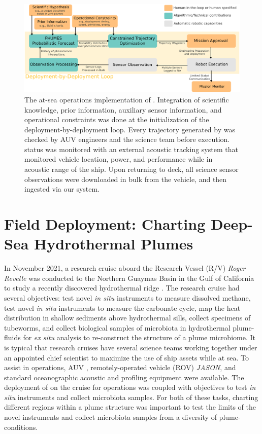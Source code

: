 \begin{figure}[h!]
    \centering
    \includegraphics[width=1\columnwidth]{figures/deployment_loop.png}
    \caption{The at-sea operations implementation of \PHORTEX. Integration of scientific knowledge, prior information, auxiliary sensor information, and operational constraints was done at the initialization of the \PHORTEX deployment-by-deployment loop. Every trajectory generated by \PHORTEX was checked by AUV \Sentry engineers and the science team before execution. \Sentry status was monitored with an external acoustic tracking system that monitored vehicle location, power, and performance while in acoustic range of the ship. Upon returning to deck, all science sensor observations were downloaded in bulk from the vehicle, and then ingested via our \PHORTEX system.}
    \label{fig:at_sea_ops}
\end{figure}



\section{Field Deployment: Charting Deep-Sea Hydrothermal Plumes}
\label{sec:field_results}

In November 2021, a research cruise aboard the Research Vessel (R/V) \emph{Roger Revelle} was conducted to the Northern Guaymas Basin in the Gulf of California to study a recently discovered hydrothermal ridge \cite{soule2018exploration, geilert2018formation}. The research cruise had several objectives: test novel \emph{in situ} instruments to measure dissolved methane, test novel \emph{in situ} instruments to measure the carbonate cycle, map the heat distribution in shallow sediments above hydrothermal sills, collect specimens of tubeworms, and collect biological samples of microbiota in hydrothermal plume-fluids for \emph{ex situ} analysis to re-construct the structure of a plume microbiome. It is typical that research cruises have several science teams working together under an appointed chief scientist to maximize the use of ship assets while at sea. To assist in operations, AUV \Sentry, remotely-operated vehicle (ROV) \emph{JASON}, and standard oceanographic acoustic and profiling equipment were available. The deployment of \PHORTEX on the cruise for \Sentry operations was coupled with objectives to test \emph{in situ} instruments and collect microbiota samples. For both of these tasks, charting different regions within a plume structure was important to test the limits of the novel instruments and collect microbiota samples from a diversity of plume-conditions.


